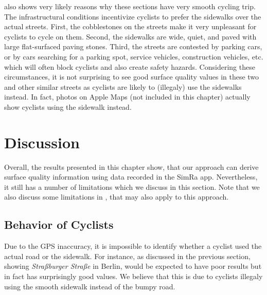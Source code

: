  also shows very likely reasons why these sections have very smooth cycling trip.
The infrastructural conditions incentivize cyclists to prefer the sidewalks over the actual streets.
First, the cobblestones on the streets make it very unpleasant for cyclists to cycle on them.
Second, the sidewalks are wide, quiet, and paved with large flat-surfaced paving stones.
Third, the streets are contested by parking cars, or by cars searching for a parking spot, service vehicles, construction vehicles, etc. which will often block cyclists and also create safety hazards.
Considering these circumstances, it is not surprising to see good surface quality values in these two and other similar streets as cyclists are likely to (illegaly) use the sidewalks instead.
In fact, photos on Apple Maps (not included in this chapter) actually show cyclists using the sidewalk instead.

\begin{table}%
\centering
\caption{Surface Quality Analysis Evaluation Results Showing Mean, Median and Standard Deviation of Sections With (Seemingly) Confusing Results}%
\label{tab:mismatch}
\end{table}

\section{Discussion}
\label{sec:discussion_cyclequality}
Overall, the results presented in this chapter show, that our approach can derive surface quality information using data recorded in the SimRa app.
Nevertheless, it still has a number of limitations which we discuss in this section.
Note that we also discuss some limitations in , that may also apply to this approach.


\subsection{Behavior of Cyclists}
\label{subsec:behavior_of_cyclists}
Due to the GPS inaccuracy, it is impossible to identify whether a cyclist used the actual road or the sidewalk.
For instance, as discussed in the previous section,  showing \textit{Straßburger Straße} in Berlin, would be expected to have poor results but in fact has surprisingly good values.
We believe that this is due to cyclists illegaly using the smooth sidewalk instead of the bumpy road.

